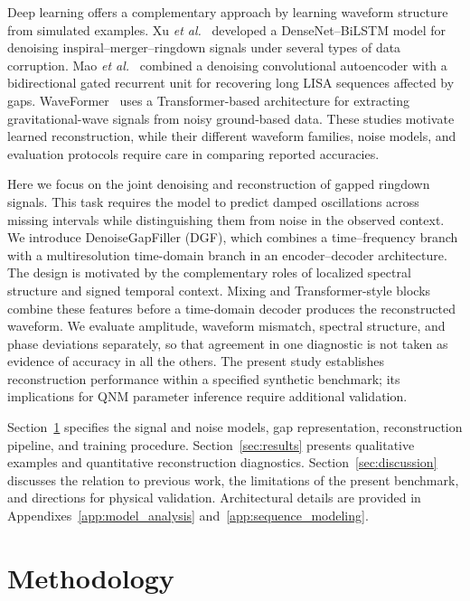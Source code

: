 \documentclass[prd,aps,a4paper,twocolumn,superscriptaddress,nofootinbib,floatfix]{revtex4-2}
\begin{document}
Deep learning offers a complementary approach by learning waveform structure from simulated examples. Xu \textit{et al.}~\cite{Xu_2024} developed a DenseNet--BiLSTM model for denoising inspiral--merger--ringdown signals under several types of data corruption. Mao \textit{et al.}~\cite{Mao:2025cae} combined a denoising convolutional autoencoder with a bidirectional gated recurrent unit for recovering long LISA sequences affected by gaps. WaveFormer~\cite{Wang:2024waveformer} uses a Transformer-based architecture for extracting gravitational-wave signals from noisy ground-based data. These studies motivate learned reconstruction, while their different waveform families, noise models, and evaluation protocols require care in comparing reported accuracies.

Here we focus on the joint denoising and reconstruction of gapped ringdown signals. This task requires the model to predict damped oscillations across missing intervals while distinguishing them from noise in the observed context. We introduce DenoiseGapFiller (DGF), which combines a time--frequency branch with a multiresolution time-domain branch in an encoder--decoder architecture. The design is motivated by the complementary roles of localized spectral structure and signed temporal context. Mixing and Transformer-style blocks combine these features before a time-domain decoder produces the reconstructed waveform. We evaluate amplitude, waveform mismatch, spectral structure, and phase deviations separately, so that agreement in one diagnostic is not taken as evidence of accuracy in all the others. The present study establishes reconstruction performance within a specified synthetic benchmark; its implications for QNM parameter inference require additional validation.

Section~\ref{sec:method} specifies the signal and noise models, gap representation, reconstruction pipeline, and training procedure. Section~\ref{sec:results} presents qualitative examples and quantitative reconstruction diagnostics. Section~\ref{sec:discussion} discusses the relation to previous work, the limitations of the present benchmark, and directions for physical validation. Architectural details are provided in Appendixes~\ref{app:model_analysis} and~\ref{app:sequence_modeling}.

\section{Methodology}
\label{sec:method}
\end{document}
